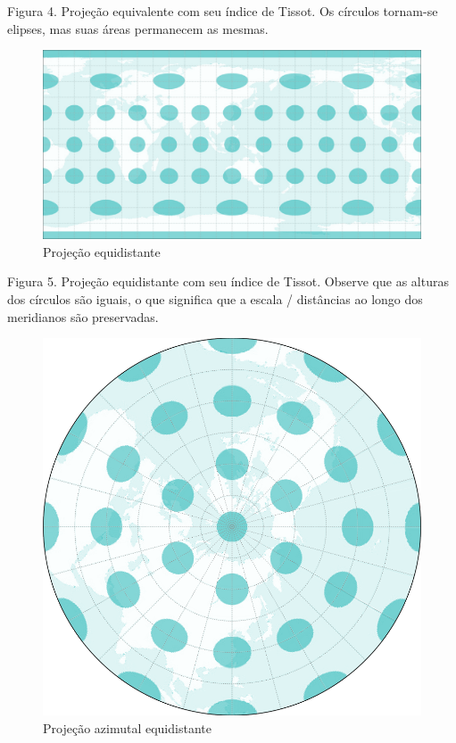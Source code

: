 \documentclass[
  portuguese,
]{krantz}
\begin{document}
Figura 4. Projeção equivalente com seu índice de Tissot. Os círculos tornam-se elipses, mas suas áreas permanecem as mesmas.

\begin{figure}
\centering
\includegraphics{media/modulo0/equidistant.png}
\caption{Projeção equidistante}
\end{figure}

Figura 5. Projeção equidistante com seu índice de Tissot. Observe que as alturas dos círculos são iguais, o que significa que a escala / distâncias ao longo dos meridianos são preservadas.

\begin{figure}
\centering
\includegraphics{media/modulo0/az-equidistant.png}
\caption{Projeção azimutal equidistante}
\end{figure}
\end{document}
